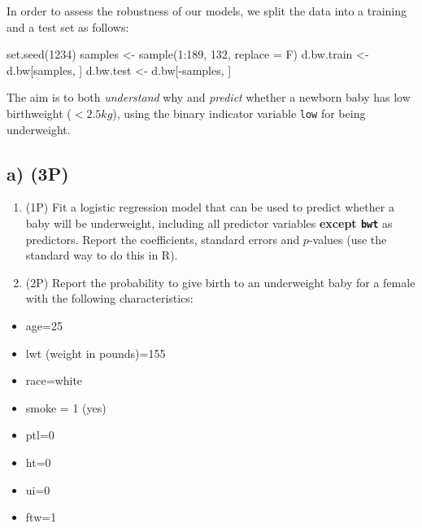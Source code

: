 \documentclass[
]{article}
\newenvironment{Shaded}{\begin{snugshade}}{\end{snugshade}}
\newcommand{\AttributeTok}[1]{\textcolor[rgb]{0.77,0.63,0.00}{#1}}
\newcommand{\DecValTok}[1]{\textcolor[rgb]{0.00,0.00,0.81}{#1}}
\newcommand{\FunctionTok}[1]{\textcolor[rgb]{0.00,0.00,0.00}{#1}}
\newcommand{\NormalTok}[1]{#1}
\newcommand{\OtherTok}[1]{\textcolor[rgb]{0.56,0.35,0.01}{#1}}
\newcommand{\SpecialCharTok}[1]{\textcolor[rgb]{0.00,0.00,0.00}{#1}}
\providecommand{\tightlist}{%
  \setlength{\itemsep}{0pt}\setlength{\parskip}{0pt}}
\begin{document}
In order to assess the robustness of our models, we split the data into
a training and a test set as follows:

\begin{Shaded}
\begin{Highlighting}[]
\FunctionTok{set.seed}\NormalTok{(}\DecValTok{1234}\NormalTok{)}
\NormalTok{samples }\OtherTok{\textless{}{-}} \FunctionTok{sample}\NormalTok{(}\DecValTok{1}\SpecialCharTok{:}\DecValTok{189}\NormalTok{, }\DecValTok{132}\NormalTok{, }\AttributeTok{replace =}\NormalTok{ F)}
\NormalTok{d.bw.train }\OtherTok{\textless{}{-}}\NormalTok{ d.bw[samples, ]}
\NormalTok{d.bw.test }\OtherTok{\textless{}{-}}\NormalTok{ d.bw[}\SpecialCharTok{{-}}\NormalTok{samples, ]}
\end{Highlighting}
\end{Shaded}

The aim is to both \emph{understand} why and \emph{predict} whether a
newborn baby has low birthweight (\(<2.5kg\)), using the binary
indicator variable \texttt{low} for being underweight.

\hypertarget{a-3p}{%
\subsection{a) (3P)}\label{a-3p}}

\begin{enumerate}
\def\labelenumi{(\roman{enumi})}
\item
  (1P) Fit a logistic regression model that can be used to predict
  whether a baby will be underweight, including all predictor variables
  \textbf{except \texttt{bwt}} as predictors. Report the coefficients,
  standard errors and \(p\)-values (use the standard way to do this in
  R).
\item
  (2P) Report the probability to give birth to an underweight baby for a
  female with the following characteristics:
\end{enumerate}

\begin{itemize}
\tightlist
\item
  age=25
\item
  lwt (weight in pounds)=155
\item
  race=white
\item
  smoke = 1 (yes)
\item
  ptl=0
\item
  ht=0
\item
  ui=0
\item
  ftw=1
\end{itemize}
\end{document}
